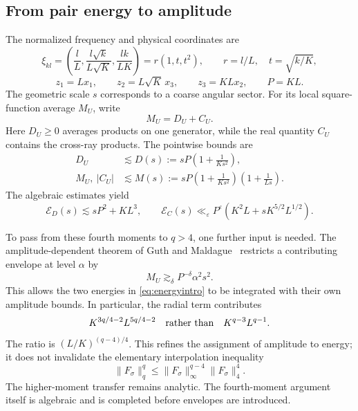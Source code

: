 \documentclass[11pt,reqno]{amsart}
\numberwithin{equation}{section}
\theoremstyle{definition}
\theoremstyle{remark}
\newcommand{\eps}{\varepsilon}
\newcommand{\ED}{\mathcal E_D}
\newcommand{\EC}{\mathcal E_C}
\begin{document}
\subsection{From pair energy to amplitude}
The normalized frequency and physical coordinates are
\begin{equation}\label{eq:cone}
 \xi_{kl}=\left(\frac lL,\frac{l\sqrt{k}}{L\sqrt K},\frac{lk}{LK}\right)
 =r(1,t,t^2),\qquad r=l/L,\quad t=\sqrt{k/K},
\end{equation}
\[
 z_1=Lx_1,\qquad z_2=L\sqrt K\,x_3,\qquad z_3=KLx_2,\qquad P=KL.
\]
The geometric scale $s$ corresponds to a coarse angular sector.
For its local square-function average $M_U$, write
\[
 M_U=D_U+C_U.
\]
Here $D_U\ge0$ averages products on one generator, while the real quantity $C_U$
contains the cross-ray products. The pointwise bounds are
\begin{align}
 D_U&\lesssim D(s):=sP\left(1+\frac1{Ks^2}\right),\label{eq:introD}\\
 M_U,\ |C_U|&\lesssim M(s):=sP\left(1+\frac1{Ks^2}\right)
                                  \left(1+\frac1{Ls}\right).\label{eq:introM}
\end{align}
The algebraic estimates yield
\begin{equation}\label{eq:energyintro}
 \ED(s)\lesssim sP^2+KL^3,\qquad
 \EC(s)\ll_\eps P^\eps(K^2L+sK^{5/2}L^{1/2}).
\end{equation}

To pass from these fourth moments to $q>4$, one further input is needed.
The amplitude-dependent theorem of Guth and Maldague~\cite[Theorem~2]{GM} restricts a
contributing envelope at level $\alpha$ by
\begin{equation}\label{eq:introthreshold}
 M_U\gtrsim_\delta P^{-\delta}\alpha^2s^2.
\end{equation}
This allows the two energies in \eqref{eq:energyintro} to be integrated with their own
amplitude bounds. In particular, the radial term contributes
\begin{equation}\label{eq:radialgain}
 K^{3q/4-2}L^{5q/4-2}
 \quad\hbox{rather than}\quad K^{q-3}L^{q-1}.
\end{equation}
The ratio is $(L/K)^{(q-4)/4}$. This refines the assignment of amplitude to energy; it does
not invalidate the elementary interpolation inequality
\begin{equation}\label{eq:interpolation}
 \|F_\sigma\|_q^q\le\|F_\sigma\|_\infty^{q-4}\|F_\sigma\|_4^4.
\end{equation}
The higher-moment transfer remains analytic. The fourth-moment argument itself is
algebraic and is completed before envelopes are introduced.
\end{document}
